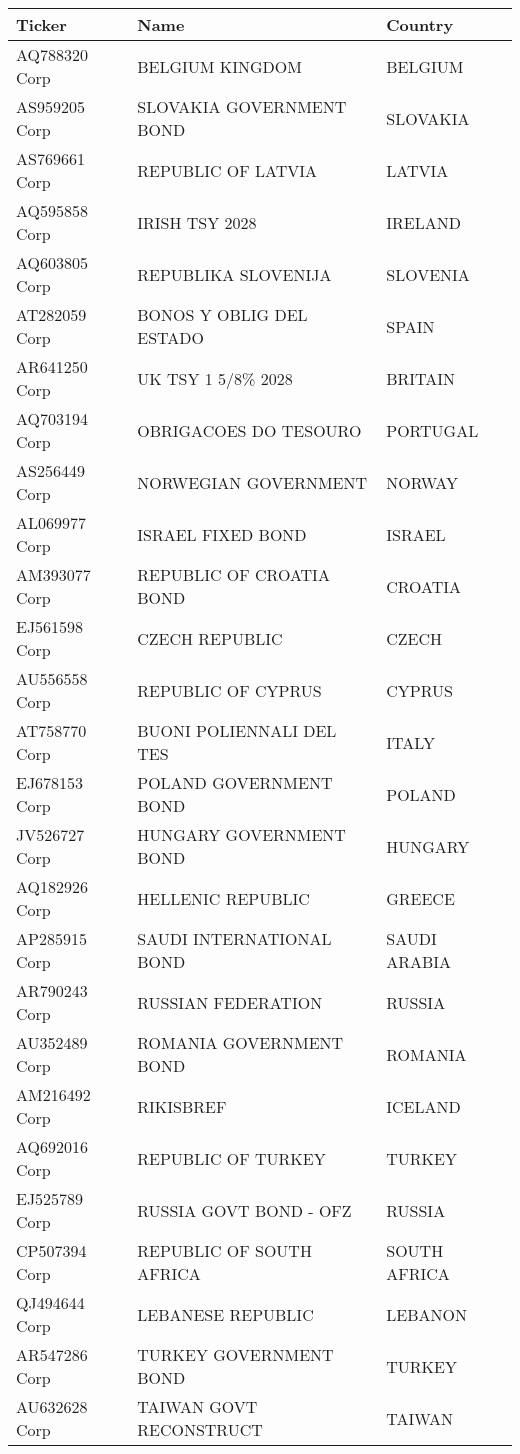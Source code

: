 \begin {table}[H]
\begin{center}
\small
\begin{tabu}{| l l l |} 
\hline
Ticker & Name & Country \\
\hline
AQ788320 Corp & BELGIUM KINGDOM & BELGIUM \\
AS959205 Corp & SLOVAKIA GOVERNMENT BOND & SLOVAKIA \\
AS769661 Corp & REPUBLIC OF LATVIA & LATVIA \\
AQ595858 Corp & IRISH TSY 2028 & IRELAND \\
AQ603805 Corp & REPUBLIKA SLOVENIJA & SLOVENIA \\
AT282059 Corp & BONOS Y OBLIG DEL ESTADO & SPAIN \\
AR641250 Corp & UK TSY 1 5/8\% 2028 & BRITAIN \\
AQ703194 Corp & OBRIGACOES DO TESOURO & PORTUGAL \\
AS256449 Corp & NORWEGIAN GOVERNMENT & NORWAY \\
AL069977 Corp & ISRAEL FIXED BOND & ISRAEL \\
AM393077 Corp & REPUBLIC OF CROATIA BOND & CROATIA \\
EJ561598 Corp & CZECH REPUBLIC & CZECH \\
AU556558 Corp & REPUBLIC OF CYPRUS & CYPRUS \\
AT758770 Corp & BUONI POLIENNALI DEL TES & ITALY \\
EJ678153 Corp & POLAND GOVERNMENT BOND & POLAND \\
JV526727 Corp & HUNGARY GOVERNMENT BOND & HUNGARY \\
AQ182926 Corp & HELLENIC REPUBLIC & GREECE \\
AP285915 Corp & SAUDI INTERNATIONAL BOND & SAUDI ARABIA \\
AR790243 Corp & RUSSIAN FEDERATION & RUSSIA \\
AU352489 Corp & ROMANIA GOVERNMENT BOND & ROMANIA \\
AM216492 Corp & RIKISBREF & ICELAND \\
AQ692016 Corp & REPUBLIC OF TURKEY & TURKEY \\
EJ525789 Corp & RUSSIA GOVT BOND - OFZ & RUSSIA \\
CP507394 Corp & REPUBLIC OF SOUTH AFRICA & SOUTH AFRICA \\
QJ494644 Corp & LEBANESE REPUBLIC & LEBANON \\
AR547286 Corp & TURKEY GOVERNMENT BOND & TURKEY \\
AU632628 Corp & TAIWAN GOVT RECONSTRUCT & TAIWAN \\

\end{tabu}
\end{center}
\end{table}
